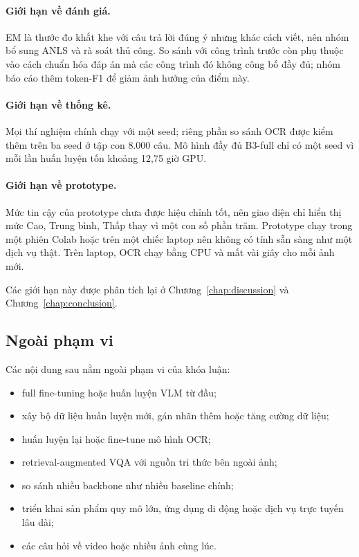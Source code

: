 \paragraph{Giới hạn về đánh giá.} EM là thước đo khắt khe với câu trả lời đúng ý
nhưng khác cách viết, nên nhóm bổ sung ANLS và rà soát thủ công. So sánh với công trình
trước còn phụ thuộc vào cách chuẩn hóa đáp án mà các công trình đó không công bố
đầy đủ; nhóm báo cáo thêm token-F1 để giảm ảnh hưởng của điểm này.

\paragraph{Giới hạn về thống kê.} Mọi thí nghiệm chính chạy với một seed; riêng
phần so sánh OCR được kiểm thêm trên ba seed ở tập con 8.000 câu. Mô hình đầy đủ
B3-full chỉ có một seed vì mỗi lần huấn luyện tốn khoảng 12,75 giờ GPU.

\paragraph{Giới hạn về prototype.} Mức tin cậy của prototype chưa được hiệu chỉnh
tốt, nên giao diện chỉ hiển thị mức Cao, Trung bình, Thấp thay vì một con số phần
trăm. Prototype chạy trong một phiên Colab hoặc trên một chiếc laptop nên không có tính
sẵn sàng như một dịch vụ thật. Trên laptop, OCR chạy bằng CPU và mất vài giây cho
mỗi ảnh mới.

Các giới hạn này được phân tích lại ở Chương~\ref{chap:discussion} và
Chương~\ref{chap:conclusion}.

\subsection{Ngoài phạm vi}

Các nội dung sau nằm ngoài phạm vi của khóa luận:

\begin{itemize}
  \item full fine-tuning hoặc huấn luyện VLM từ đầu;
  \item xây bộ dữ liệu huấn luyện mới, gán nhãn thêm hoặc tăng cường dữ liệu;
  \item huấn luyện lại hoặc fine-tune mô hình OCR;
  \item retrieval-augmented VQA với nguồn tri thức bên ngoài ảnh;
  \item so sánh nhiều backbone như nhiều baseline chính;
  \item triển khai sản phẩm quy mô lớn, ứng dụng di động hoặc dịch vụ trực tuyến
  lâu dài;
  \item các câu hỏi về video hoặc nhiều ảnh cùng lúc.
\end{itemize}

